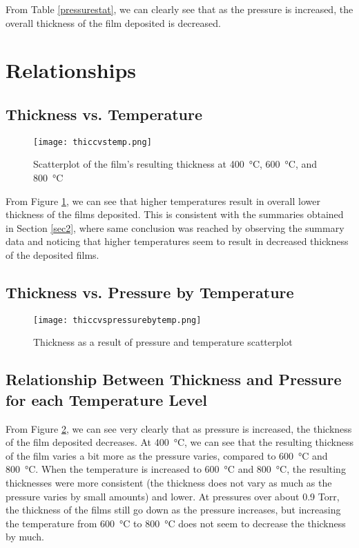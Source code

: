 \documentclass[letterpaper]{article}
\begin{document}
From Table \ref{pressurestat}, we can clearly see that as the pressure is increased,
the overall thickness of the film deposited is decreased.
\section{Relationships}

\subsection{Thickness vs. Temperature}

\begin{figure}[H]
 \centering
 \texttt{[image: thiccvstemp.png]}
 \caption{Scatterplot of the film's resulting thickness at \SI{400}{\celsius}, \SI{600}{\celsius}, and \SI{800}{\celsius}}
 \label{thiccvstemp}
\end{figure}

From Figure \ref{thiccvstemp}, we can see that higher temperatures result in
overall lower thickness of the films deposited. This is consistent with the summaries
obtained in Section \ref{sec2}, where same conclusion was reached by observing the summary data
and noticing that higher temperatures seem to result in decreased thickness of the deposited films.

\subsection{Thickness vs. Pressure by Temperature}

\begin{figure}[H]
 \centering
 \texttt{[image: thiccvspressurebytemp.png]}
 \caption{Thickness as a result of pressure and temperature scatterplot}
 \label{thiccvspressurebytemp}
\end{figure}


\subsection{Relationship Between Thickness and Pressure for each Temperature Level}

From Figure \ref{thiccvspressurebytemp}, we can see very clearly that as pressure
is increased, the thickness of the film deposited decreases. At \SI{400}{\celsius},
we can see that the resulting thickness of the film varies a bit more as the pressure
varies, compared to \SI{600}{\celsius} and \SI{800}{\celsius}. When the temperature is
increased to \SI{600}{\celsius} and \SI{800}{\celsius}, the resulting thicknesses were
more consistent (the thickness does not vary as much as the pressure varies by small amounts) and lower. At pressures over about 0.9 Torr, the thickness
of the films still go down as the pressure increases, but increasing the temperature from
\SI{600}{\celsius} to \SI{800}{\celsius} does not seem to decrease the thickness by much.
\end{document}

